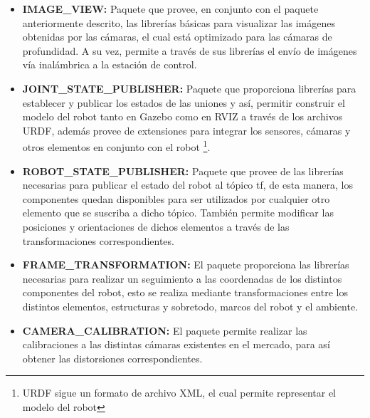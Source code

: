 \begin{itemize}
    \item \textbf{IMAGE\_VIEW:} Paquete que provee, en conjunto con el paquete anteriormente descrito, las librerías básicas para visualizar las imágenes obtenidas por las cámaras, el cual está optimizado para las cámaras de profundidad. A su vez, permite a través de sus librerías el envío de imágenes vía inalámbrica a la estación de control.
    \item \textbf{JOINT\_STATE\_PUBLISHER:} Paquete que proporciona librerías para establecer y publicar los estados de las uniones y así, permitir construir el modelo del robot tanto en Gazebo como en RVIZ a través de los archivos URDF, además provee de extensiones para integrar los sensores, cámaras y otros elementos en conjunto con el robot \footnote{URDF sigue un formato de archivo XML, el cual permite representar el modelo del robot}.
    \item \textbf{ROBOT\_STATE\_PUBLISHER:} Paquete que provee de las librerías necesarias para publicar el estado del robot al tópico tf, de esta manera, los componentes quedan disponibles para ser utilizados por cualquier otro elemento que se suscriba a dicho tópico. También permite modificar las posiciones y orientaciones de dichos elementos a través de las transformaciones correspondientes.
    \item \textbf{FRAME\_TRANSFORMATION:} El paquete proporciona las librerías necesarias para realizar un seguimiento a las coordenadas de los distintos componentes del robot, esto se realiza mediante transformaciones entre los distintos elementos, estructuras y sobretodo, marcos del robot y el ambiente.
    \item \textbf{CAMERA\_CALIBRATION:} El paquete permite realizar las calibraciones a las distintas cámaras existentes en el mercado, para así obtener las distorsiones correspondientes.
\end{itemize}

